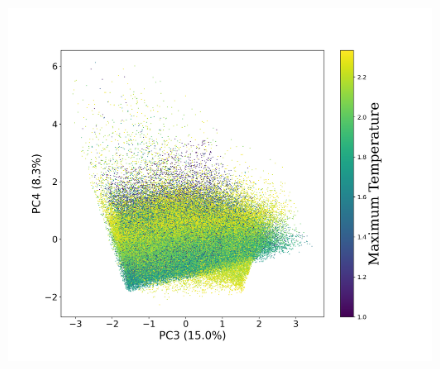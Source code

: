 \documentclass{aa}
\begin{document}
\begin{CJK*}{UTF8}{gbsn}
\begin{figure}[htbp]
{        \label{C1-34-maxtemp}
        \includegraphics[scale = 0.27]{7/PC3&4_maxTemp.png}
        } 
        \vspace{-8mm}
        \\
        \subfigure[]{
        \label{C1-34-radfield}
}
\end{figure}
\end{CJK*}
\end{document}

